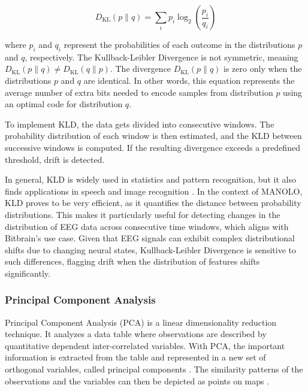 \begin{equation}
D_{\text{KL}}(p \parallel q) = \sum_i p_i \log_2 \left( \frac{p_i}{q_i} \right)
\end{equation}

where \( p_i \) and \( q_i \) represent the probabilities of each outcome in the distributions \( p \) and \( q \), respectively. The Kullback-Leibler Divergence is not symmetric, meaning \( D_{\text{KL}}(p \parallel q) \neq D_{\text{KL}}(q \parallel p) \). The divergence \( D_{\text{KL}}(p \parallel q) \) is zero only when the distributions \( p \) and \( q \) are identical. In other words, this equation represents the average number of extra bits needed to encode samples from distribution \( p \) using an optimal code for distribution \( q \). 

To implement KLD, the data gets divided into consecutive windows. The probability distribution of each window is then estimated, and the KLD between successive windows is computed. If the resulting divergence exceeds a predefined threshold, drift is detected.

In general, KLD is widely used in statistics and pattern recognition, but it also finds applications in speech and image recognition \cite{hershey2007approximating}. In the context of MANOLO, KLD proves to be very efficient, as it quantifies the distance between probability distributions. This makes it particularly useful for detecting changes in the distribution of EEG data across consecutive time windows, which aligns with Bitbrain’s use case. Given that EEG signals can exhibit complex distributional shifts due to changing neural states, Kullback-Leibler Divergence is sensitive to such differences, flagging drift when the distribution of features shifts significantly.

\subsubsection{Principal Component Analysis}

Principal Component Analysis (PCA) is a linear dimensionality reduction technique. It analyzes a data table where observations are described by quantitative dependent inter-correlated variables. With PCA, the important information is extracted from the table and represented in a new set of orthogonal variables, called principal components \cite{bro2014principal}. The similarity patterns of the observations and the variables can then be depicted as points on maps \cite{abdi2010principal}.

